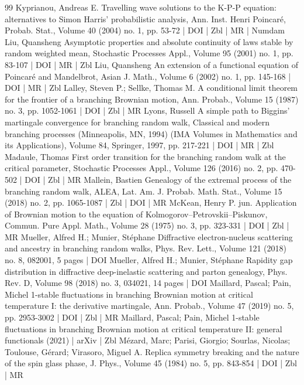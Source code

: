 \begin{thebibliography}{99}
 Kyprianou, Andreas E. Travelling wave solutions to the K-P-P equation: alternatives to Simon Harris’ probabilistic analysis, Ann. Inst. Henri Poincaré, Probab. Stat., Volume 40 (2004) no. 1, pp. 53-72 | DOI | Zbl | MR | Numdam
 Liu, Quansheng Asymptotic properties and absolute continuity of laws stable by random weighted mean, Stochastic Processes Appl., Volume 95 (2001) no. 1, pp. 83-107 | DOI | MR | Zbl
 Liu, Quansheng An extension of a functional equation of Poincaré and Mandelbrot, Asian J. Math., Volume 6 (2002) no. 1, pp. 145-168 | DOI | MR | Zbl
 Lalley, Steven P.; Sellke, Thomas M. A conditional limit theorem for the frontier of a branching Brownian motion, Ann. Probab., Volume 15 (1987) no. 3, pp. 1052-1061 | DOI | Zbl | MR
 Lyons, Russell A simple path to Biggins’ martingale convergence for branching random walk, Classical and modern branching processes (Minneapolis, MN, 1994) (IMA Volumes in Mathematics and its Applications), Volume 84, Springer, 1997, pp. 217-221 | DOI | MR | Zbl
 Madaule, Thomas First order transition for the branching random walk at the critical parameter, Stochastic Processes Appl., Volume 126 (2016) no. 2, pp. 470-502 | DOI | Zbl | MR
 Mallein, Bastien Genealogy of the extremal process of the branching random walk, ALEA, Lat. Am. J. Probab. Math. Stat., Volume 15 (2018) no. 2, pp. 1065-1087 | Zbl | DOI | MR
 McKean, Henry P. jun. Application of Brownian motion to the equation of Kolmogorov–Petrovskii–Piskunov, Commun. Pure Appl. Math., Volume 28 (1975) no. 3, pp. 323-331 | DOI | Zbl | MR
 Mueller, Alfred H.; Munier, Stéphane Diffractive electron-nucleus scattering and ancestry in branching random walks, Phys. Rev. Lett., Volume 121 (2018) no. 8, 082001, 5 pages | DOI
 Mueller, Alfred H.; Munier, Stéphane Rapidity gap distribution in diffractive deep-inelastic scattering and parton genealogy, Phys. Rev. D, Volume 98 (2018) no. 3, 034021, 14 pages | DOI
 Maillard, Pascal; Pain, Michel 1-stable fluctuations in branching Brownian motion at critical temperature I: the derivative martingale, Ann. Probab., Volume 47 (2019) no. 5, pp. 2953-3002 | DOI | Zbl | MR
 Maillard, Pascal; Pain, Michel 1-stable fluctuations in branching Brownian motion at critical temperature II: general functionals (2021) | arXiv | Zbl
 Mézard, Marc; Parisi, Giorgio; Sourlas, Nicolas; Toulouse, Gérard; Virasoro, Miguel A. Replica symmetry breaking and the nature of the spin glass phase, J. Phys., Volume 45 (1984) no. 5, pp. 843-854 | DOI | Zbl | MR

\end{thebibliography}
